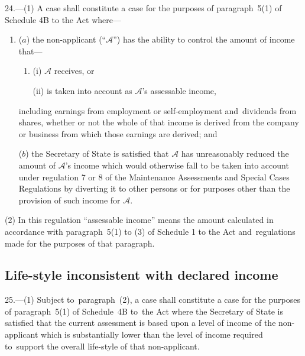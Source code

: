 \documentclass[12pt,a4paper]{article}
\begin{document}
24.---(1)  A case shall constitute a case for the purposes of paragraph~5(1) of Schedule 4B to the Act where—
\begin{enumerate}\item[]
($a$) the non-applicant (“$\mathcal{A}$”) has the ability to control the amount of income that—
\begin{enumerate}\item[]
(i) $\mathcal{A}$ receives, or

(ii) is taken into account as $\mathcal{A}$’s assessable income,
\end{enumerate}
including earnings from employment or self-employment and~dividends from shares, whether or not the whole of that income is derived from the company or business from which those earnings are derived; and

($b$) the 
Secretary of State  %
is satisfied that $\mathcal{A}$ has unreasonably reduced the amount of $\mathcal{A}$’s income which would otherwise fall to be taken into account under regulation 7 or 8 of the Maintenance Assessments and Special Cases Regulations by diverting it to other persons or for purposes other than the provision of such income for $\mathcal{A}$.
\end{enumerate}

(2) In this regulation “assessable income” means the amount calculated in accordance with paragraph~5(1) to (3) of Schedule 1 to the Act and~regulations made for the purposes of that paragraph.


\subsection[25. Life-style inconsistent with declared income]{Life-style inconsistent with declared income}

25.—(1) Subject to~paragraph~(2), a case shall constitute a case for the purposes of paragraph~5(1) of Schedule~4B to~the Act where the Secretary of State is satisfied that the current 
assessment is based upon a level of income of the non-applicant which is substantially lower than the level of income required to~support the overall life-style of that non-applicant.
\end{document}

